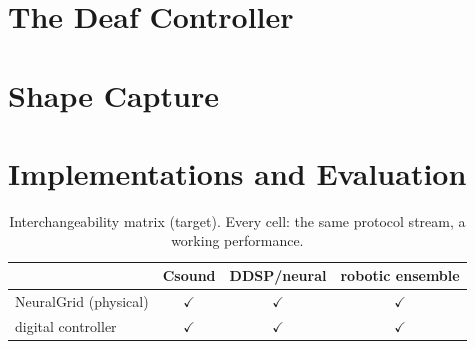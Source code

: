 \documentclass[10pt,twocolumn]{article}
\begin{document}
\section{The Deaf Controller}


\section{Shape Capture}


\section{Implementations and Evaluation}

\begin{table}[h]\centering\scriptsize
\begin{tabular}{lccc}
\toprule
 & Csound & DDSP/neural & robotic ensemble \\
\midrule
NeuralGrid (physical) & $\checkmark$ & $\checkmark$ & $\checkmark$ \\
digital controller    & $\checkmark$ & $\checkmark$ & $\checkmark$ \\
\bottomrule
\end{tabular}
\caption{Interchangeability matrix (target). Every cell: the same
protocol stream, a working performance.}
\end{table}
\end{document}
